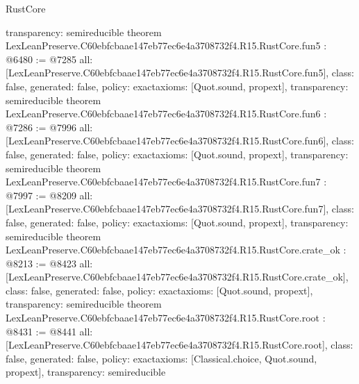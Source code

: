 \begin{lexlean}{RustCore}
\begin{coremodule}
{  transparency: semireducible
}
theorem LexLeanPreserve.C60ebfcbaae147eb77ec6e4a3708732f4.R15.RustCore.fun5 : @6480 := @7285 {
  all: [LexLeanPreserve.C60ebfcbaae147eb77ec6e4a3708732f4.R15.RustCore.fun5],
  class: false,
  generated: false,
  policy: exact{axioms: [Quot.sound, propext]},
  transparency: semireducible
}
theorem LexLeanPreserve.C60ebfcbaae147eb77ec6e4a3708732f4.R15.RustCore.fun6 : @7286 := @7996 {
  all: [LexLeanPreserve.C60ebfcbaae147eb77ec6e4a3708732f4.R15.RustCore.fun6],
  class: false,
  generated: false,
  policy: exact{axioms: [Quot.sound, propext]},
  transparency: semireducible
}
theorem LexLeanPreserve.C60ebfcbaae147eb77ec6e4a3708732f4.R15.RustCore.fun7 : @7997 := @8209 {
  all: [LexLeanPreserve.C60ebfcbaae147eb77ec6e4a3708732f4.R15.RustCore.fun7],
  class: false,
  generated: false,
  policy: exact{axioms: [Quot.sound, propext]},
  transparency: semireducible
}
theorem LexLeanPreserve.C60ebfcbaae147eb77ec6e4a3708732f4.R15.RustCore.crate_ok : @8213 := @8423 {
  all: [LexLeanPreserve.C60ebfcbaae147eb77ec6e4a3708732f4.R15.RustCore.crate_ok],
  class: false,
  generated: false,
  policy: exact{axioms: [Quot.sound, propext]},
  transparency: semireducible
}
theorem LexLeanPreserve.C60ebfcbaae147eb77ec6e4a3708732f4.R15.RustCore.root : @8431 := @8441 {
  all: [LexLeanPreserve.C60ebfcbaae147eb77ec6e4a3708732f4.R15.RustCore.root],
  class: false,
  generated: false,
  policy: exact{axioms: [Classical.choice, Quot.sound, propext]},
  transparency: semireducible
}


\end{coremodule}
\end{lexlean}
